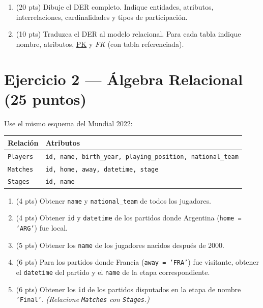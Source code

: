 \documentclass[11pt,a4paper]{article}
\begin{document}
\begin{enumerate}
  \item (20 pts) Dibuje el DER completo. Indique entidades, atributos, interrelaciones, cardinalidades y tipos de participación.
  \vspace{10cm}
  \item (10 pts) Traduzca el DER al modelo relacional. Para cada tabla indique nombre, atributos, \underline{PK} y \textit{FK} (con tabla referenciada).
\end{enumerate}

\newpage

\section*{Ejercicio 2 — Álgebra Relacional \hfill\normalfont(25 puntos)}

Use el mismo esquema del Mundial 2022:

\begin{center}
\begin{tabular}{ll}
\toprule
\textbf{Relación} & \textbf{Atributos} \\
\midrule
\texttt{Players} & \texttt{id, name, birth\_year, playing\_position, national\_team} \\
\texttt{Matches}  & \texttt{id, home, away, datetime, stage} \\
\texttt{Stages}   & \texttt{id, name} \\
\bottomrule
\end{tabular}
\end{center}

\begin{enumerate}
  \item (4 pts) Obtener \texttt{name} y \texttt{national\_team} de todos los jugadores.

  \vspace{2cm}

  \item (4 pts) Obtener \texttt{id} y \texttt{datetime} de los partidos donde Argentina (\texttt{home = 'ARG'}) fue local.

  \vspace{2cm}

  \item (5 pts) Obtener los \texttt{name} de los jugadores nacidos después de 2000.

  \vspace{2.5cm}

  \item (6 pts) Para los partidos donde Francia (\texttt{away = 'FRA'}) fue visitante, obtener el \texttt{datetime} del partido y el \texttt{name} de la etapa correspondiente.

  \vspace{3cm}

  \item (6 pts) Obtener los \texttt{id} de los partidos disputados en la etapa de nombre \texttt{'Final'}. \emph{(Relacione \texttt{Matches} con \texttt{Stages}.)}

  \vspace{3cm}
\end{enumerate}
\end{document}
